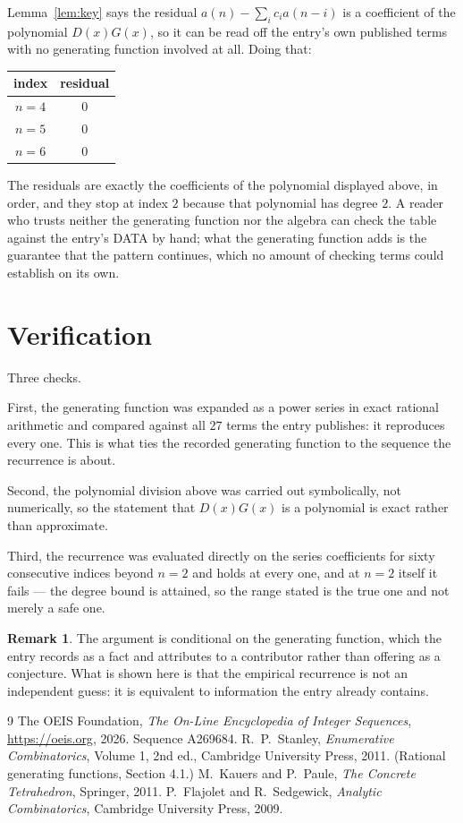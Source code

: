 \documentclass[11pt,a4paper]{article}
\theoremstyle{plain}
\theoremstyle{definition}
\newtheorem{remark}[theorem]{Remark}
\begin{document}
Lemma~\ref{lem:key} says the residual $a(n)-\sum_ic_ia(n-i)$ is a coefficient of the
polynomial $D(x)G(x)$, so it can be read off the entry's own published terms with no
generating function involved at all. Doing that:
\begin{center}
\begin{tabular}{cc}
index & residual \\ \hline
$n=4$ & $0$ \\
$n=5$ & $0$ \\
$n=6$ & $0$
\end{tabular}
\end{center}
The residuals are exactly the coefficients of the polynomial displayed above, in order, and
they stop at index $2$ because that polynomial has degree $2$. A reader who trusts
neither the generating function nor the algebra can check the table against the entry's DATA
by hand; what the generating function adds is the guarantee that the pattern continues, which
no amount of checking terms could establish on its own.

\section{Verification}

Three checks.

First, the generating function was expanded as a power series in exact rational arithmetic and
compared against all $27$ terms the entry publishes: it reproduces every one. This is
what ties the recorded generating function to the sequence the recurrence is about.

Second, the polynomial division above was carried out symbolically, not numerically, so the
statement that $D(x)G(x)$ is a polynomial is exact rather than approximate.

Third, the recurrence was evaluated directly on the series coefficients for sixty consecutive
indices beyond $n=2$ and holds at every one, and at $n=2$ itself it fails --- the
degree bound is attained, so the range stated is the true one and not merely a safe one.

\begin{remark}
The argument is conditional on the generating function, which the entry records as a fact and
attributes to a contributor rather than offering as a conjecture. What is shown here is that
the empirical recurrence is not an independent guess: it is equivalent to information the
entry already contains.
\end{remark}

\begin{thebibliography}{9}
 The OEIS Foundation, \emph{The On-Line Encyclopedia of Integer
Sequences}, \url{https://oeis.org}, 2026. Sequence A269684.
 R.~P.~Stanley, \emph{Enumerative Combinatorics}, Volume 1, 2nd ed.,
Cambridge University Press, 2011. (Rational generating functions, Section 4.1.)
 M.~Kauers and P.~Paule, \emph{The Concrete Tetrahedron}, Springer, 2011.
 P.~Flajolet and R.~Sedgewick, \emph{Analytic Combinatorics}, Cambridge
University Press, 2009.
\end{thebibliography}
\end{document}
